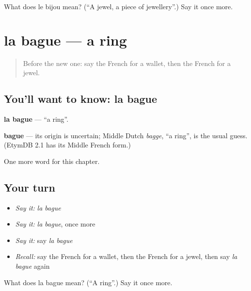 \begin{tcolorbox}[breakable,colback=teal!4,colframe=teal!35!black,title={Before you move on}]
What does le bijou mean? (\textquotedblleft{}A jewel, a piece of jewellery\textquotedblright{}.) Say it once more.
\end{tcolorbox}
\section[la bague]{la bague — a ring}

\label{lesson:FR-C118-bague}



\begin{quote}
Before the new one: say the French for a wallet, then the French for a jewel.
\end{quote}

\subsection*{You'll want to know: la bague}
\textbf{la bague} — \textquotedblleft{}a ring\textquotedblright{}.

\begin{cousinweb}
\textbf{bague} — its origin is uncertain; Middle Dutch \emph{bagge}, \textquotedblleft{}a ring\textquotedblright{}, is the usual guess. (EtymDB 2.1 has its Middle French form.)
\end{cousinweb}

\begin{grammarlens}[title={What you've built}]
One more word for this chapter.
\end{grammarlens}

\subsection*{Your turn}
\begin{itemize}
\raggedright
  \item \emph{Say it:} \emph{la bague}
  \item \emph{Say it:} \emph{la bague}, once more
  \item \emph{Say it:} say \emph{la bague}
  \item \emph{Recall:} say the French for a wallet, then the French for a jewel, then say \emph{la bague} again
\end{itemize}

\begin{tcolorbox}[breakable,colback=teal!4,colframe=teal!35!black,title={Before you move on}]
What does la bague mean? (\textquotedblleft{}A ring\textquotedblright{}.) Say it once more.
\end{tcolorbox}
